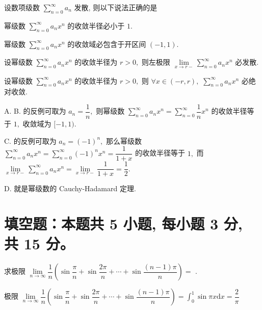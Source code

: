 \begin{question}
  设数项级数 $\sum\limits_{n=0}^\infty a_n$ 发散, 则以下说法正确的是 \paren[D]

  \begin{choices}
    \item 幂级数 $\sum\limits_{n=0}^\infty a_n x^n$ 的收敛半径必小于 $1.$
    \item 幂级数 $\sum\limits_{n=0}^\infty a_n x^n$ 的收敛域必包含于开区间 $(-1, 1).$
    \item 设幂级数 $\sum\limits_{n=0}^\infty a_n x^n$ 的收敛半径为 $r > 0,$ 则左极限 $\lim\limits_{x \to r-} \sum\limits_{n=0}^\infty a_n x^n$ 必发散.
    \item 设幂级数 $\sum\limits_{n=0}^\infty a_n x^n$ 的收敛半径为 $r > 0,$ 则 $\forall x \in (-r, r),$ $\sum\limits_{n=0}^\infty a_n x^n$ 必绝对收敛.
  \end{choices}
\end{question}

\begin{solution}
  A. B. 的反例可取为 $a_n = \dfrac{1}{n},$ 则幂级数 $\sum\limits_{n=0}^\infty a_n x^n = \sum\limits_{n=0}^\infty \dfrac{1}{n} x^n$ 的收敛半径等于 $1,$ 收敛域为 $[-1, 1).$

  C. 的反例可取为 $a_n = (-1)^n,$ 那么幂级数 $\sum\limits_{n=0}^\infty a_n x^n = \sum\limits_{n=0}^\infty (-1)^n x^n = \dfrac{1}{1+x}$ 的收敛半径等于 $1,$ 而 $\lim\limits_{x \to r-} \sum\limits_{n=0}^\infty a_n x^n = \lim\limits_{x \to r-} \dfrac{1}{1+x} = \dfrac{1}{2}.$

  D. 就是幂级数的 Cauchy-Hadamard 定理.
\end{solution}


\section{填空题：本题共 5 小题, 每小题 3 分, 共 15 分。}



\begin{question}
  求极限 $\lim\limits_{n\to\infty} \dfrac{1}{n} \left( \sin\dfrac{\pi}{n} + \sin\dfrac{2\pi}{n} + \cdots + \sin\dfrac{(n-1)\pi}{n} \right) = $ \fillin[$\dfrac{2}{\pi}$].
\end{question}

\begin{solution}
  极限 $\lim\limits_{n\to\infty} \dfrac{1}{n} \left( \sin\dfrac{\pi}{n} + \sin\dfrac{2\pi}{n} + \cdots + \sin\dfrac{(n-1)\pi}{n} \right) = \int_0^1 \sin \pi x \mathrm{d} x = \dfrac{2}{\pi}$
\end{solution}

